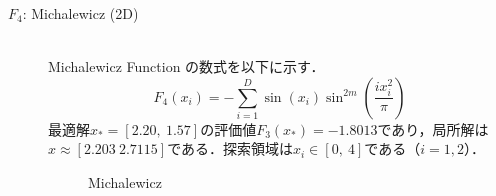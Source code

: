 \documentclass[a4j,11pt]{jarticle}
\begin{document}
\begin{description}
\item[$F_4$: Michalewicz (2D)]\mbox{}\\
Michalewicz Function \cite{MOP} の数式を以下に示す．
\begin{equation}
\label{eq:minF4}
F_4(x_i)=- \sum_{i=1}^D \sin(x_i)\sin^{2m}(\frac{ix_i^2}{\pi})
\end{equation}
最適解$x_*=[2.20, \ 1.57]$の評価値$F_3(x_*)=-1.8013$であり，局所解は$x \approx [2.203 \ 2.7115]$である．探索領域は$x_i \in [0, \ 4]$である（$i=1,2$）．
\begin{figure}[t]
\centering
{}
\caption{Michalewicz}
\label{fig:minF4}
\end{figure}


\end{description}
\end{document}
